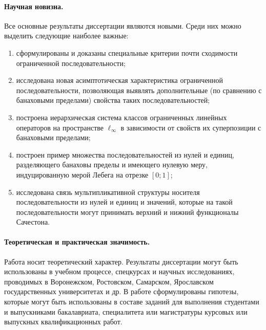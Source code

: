 \paragraph{Научная новизна.}
Все основные результаты диссертации являются новыми.
Среди них можно выделить следующие наиболее важные:
\begin{enumerate}
	\item
		сформулированы и доказаны специальные критерии почти сходимости
		ограниченной последовательности;
	\item
		исследована новая асимптотическая характеристика ограниченной последовательности,
		позволяющая выявлять дополнительные (по сравнению с банаховыми пределами)
		свойства таких последовательностей;
	\item
		построена иерархическая система классов ограниченных линейных операторов
		на пространстве $\ell_\infty$ в зависимости от свойств их суперпозиции с банаховыми пределами;
	\item
		построен пример множества последовательностей из нулей и единиц, разделяющего банаховы пределы
		и имеющего нулевую меру, индуцированную мерой Лебега на отрезке $[0;1]$;
	\item
		исследована связь мультипликативной структуры носителя последовательности из нулей и единиц
		и значений, которые на такой последовательности могут принимать верхний и нижний функционалы Сачестона.
\end{enumerate}


\paragraph{Теоретическая и практическая значимость.}
Работа носит теоретический характер.
Результаты диссертации могут быть использованы в учебном процессе, спецкурсах и научных исследованиях,
проводимых в Воронежском, Ростовском, Самарском, Ярославском государственных университетах и др.
В работе сформулированы гипотезы,
которые могут быть использованы в составе заданий для выполнения
студентами и выпускниками бакалавриата, специалитета или магистратуры
курсовых или выпускных квалификационных работ.


